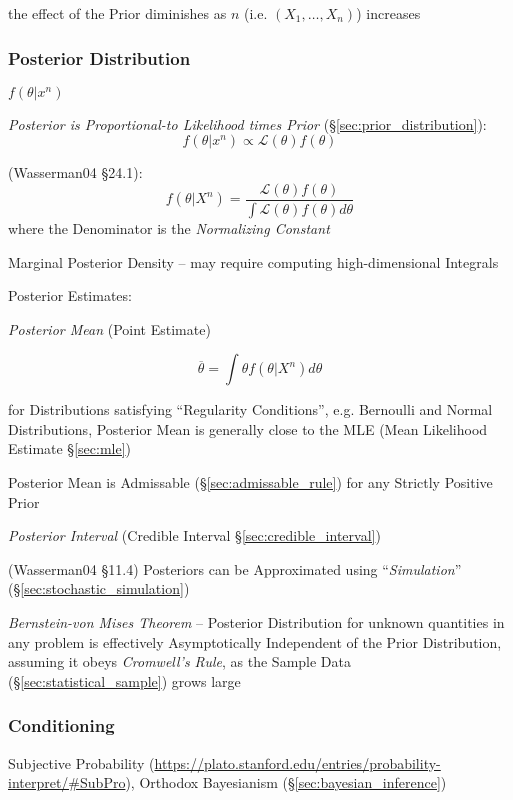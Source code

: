 the effect of the Prior diminishes as $n$ (i.e. $(X_1, \ldots, X_n)$) increases



\subsubsection{Posterior Distribution}\label{sec:posterior_distribution}

$f(\theta | x^n)$

\emph{Posterior is Proportional-to Likelihood times Prior}
(\S\ref{sec:prior_distribution}):
\[
  f(\theta | x^n) \propto \mathcal{L}(\theta)f(\theta)
\]

(Wasserman04 \S24.1):
\[
  f(\theta | X^n) = \frac{
    \mathcal{L}(\theta) f(\theta)
  }{
    \int \mathcal{L}(\theta) f(\theta) d\theta
  }
\]
where the Denominator is the \emph{Normalizing Constant}

Marginal Posterior Density -- may require computing high-dimensional Integrals

Posterior Estimates:

\emph{Posterior Mean} (Point Estimate)

\[
  \overline{\theta} = \int \theta f(\theta | X^n) d\theta
\]

for Distributions satisfying ``Regularity Conditions'', e.g. Bernoulli and
Normal Distributions, Posterior Mean is generally close to the MLE (Mean
Likelihood Estimate \S\ref{sec:mle})

Posterior Mean is Admissable (\S\ref{sec:admissable_rule}) for any Strictly
Positive Prior

\emph{Posterior Interval} (Credible Interval \S\ref{sec:credible_interval})

(Wasserman04 \S11.4) Posteriors can be Approximated using ``\emph{Simulation}''
(\S\ref{sec:stochastic_simulation})

\emph{Bernstein-von Mises Theorem} -- Posterior Distribution for unknown
quantities in any problem is effectively Asymptotically Independent of the Prior
Distribution, assuming it obeys \emph{Cromwell's Rule}, as the Sample Data
(\S\ref{sec:statistical_sample}) grows large



\subsubsection{Conditioning}\label{sec:conditioning}

Subjective Probability
(\url{https://plato.stanford.edu/entries/probability-interpret/#SubPro}),
Orthodox Bayesianism (\S\ref{sec:bayesian_inference})

